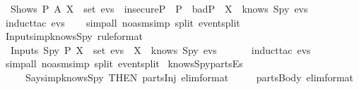 \begin{isabellebody}
  \ \ {\isachardoublequoteopen}Shows\ P\ A\ X\ {\isasymin}\ set\ evs\ {\isasymlongrightarrow}\ {\isacharparenleft}insecureP\ {\isasymand}\ P\ {\isasymin}\ badP{\isacharparenright}\ {\isasymlongrightarrow}\ X\ {\isasymin}\ knows\ Spy\ evs{\isachardoublequoteclose}\isanewline
  \isadelimproof
  \isanewline
  \ \ %
  \endisadelimproof
  \isatagproof
  \isamarkupfalse%
  \ {\isacharparenleft}induct{\isacharunderscore}tac\ {\isachardoublequoteopen}evs{\isachardoublequoteclose}{\isacharparenright}\isanewline
  \ \ \isamarkupfalse%
  \ {\isacharparenleft}simp{\isacharunderscore}all\ {\isacharparenleft}no{\isacharunderscore}asm{\isacharunderscore}simp{\isacharparenright}\ split{\isacharcolon}\ event{\isachardot}split{\isacharparenright}\isanewline
  \isamarkupfalse%
  \isanewline
  \isanewline
  \endisatagproof
  {\isafoldproof}%
  \isadelimproof
  \isanewline
  \endisadelimproof
  \isamarkupfalse%
  \ Inputs{\isacharunderscore}imp{\isacharunderscore}knows{\isacharunderscore}Spy\ {\isacharbrackleft}rule{\isacharunderscore}format{\isacharbrackright}\ {\isacharcolon}\isanewline
  \ \ {\isachardoublequoteopen}Inputs\ Spy\ P\ X\ {\isasymin}\ set\ evs\ {\isasymlongrightarrow}\ X\ {\isasymin}\ knows\ Spy\ evs{\isachardoublequoteclose}\isanewline
  \isadelimproof
  \ \ \isanewline
  \ \ %
  \endisadelimproof
  \isatagproof
  \isamarkupfalse%
  \ {\isacharparenleft}induct{\isacharunderscore}tac\ {\isachardoublequoteopen}evs{\isachardoublequoteclose}{\isacharparenright}\isanewline
  \ \ \isamarkupfalse%
  \ {\isacharparenleft}simp{\isacharunderscore}all\ {\isacharparenleft}no{\isacharunderscore}asm{\isacharunderscore}simp{\isacharparenright}\ split{\isacharcolon}\ event{\isachardot}split{\isacharparenright}\isanewline
  \isamarkupfalse%
  \endisatagproof
  {\isafoldproof}%
  \isadelimproof
  \isanewline
  \endisadelimproof
  \isanewline
  \isamarkupfalse%
  \ knows{\isacharunderscore}Spy{\isacharunderscore}partsEs\ {\isacharequal}\isanewline
  \ \ \ \ \ Says{\isacharunderscore}imp{\isacharunderscore}knows{\isacharunderscore}Spy\ {\isacharbrackleft}THEN\ parts{\isachardot}Inj{\isacharcomma}\ elim{\isacharunderscore}format{\isacharbrackright}\isanewline
  \ \ \ \ \ parts{\isachardot}Body\ {\isacharbrackleft}elim{\isacharunderscore}format{\isacharbrackright}\isanewline
  \isanewline
  \isanewline
  \isamarkupfalse%

\end{isabellebody}
